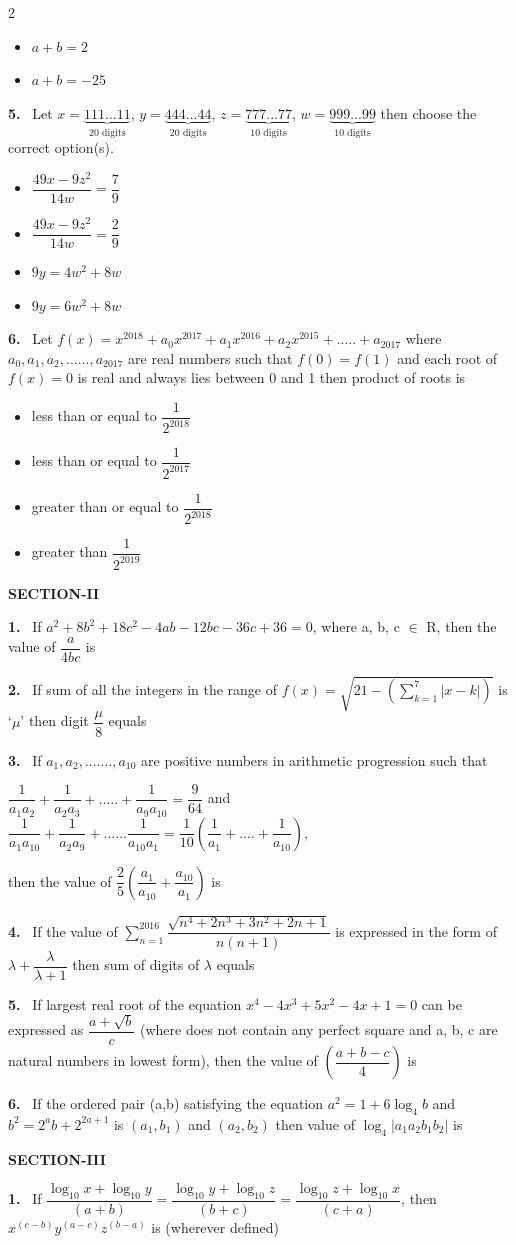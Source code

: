 \documentclass[10pt]{extarticle}
\newcommand{\sect}[1]{\par\smallskip\noindent\textbf{#1}\par}
\newcommand{\qn}[1]{\par\smallskip\noindent\textbf{#1.}~}
\newenvironment{qoptions}{\begin{itemize}[leftmargin=1.8em,itemsep=1pt,topsep=2pt,label={}]}{\end{itemize}}
\newcommand{\opt}[2]{\item[(#1)] #2}
\begin{document}
\begin{multicols}{2}
\begin{qoptions}
\opt{C}{$a+b=2$}
\opt{D}{$a+b=-25$}
\end{qoptions}
\qn{5} Let $x=\underbrace{111...11}_{\text{20 digits}}$, $y=\underbrace{444...44}_{\text{20 digits}}$, $z=\underbrace{777...77}_{\text{10 digits}}$, $w=\underbrace{999...99}_{\text{10 digits}}$ then choose the correct option(s).
\begin{qoptions}
\opt{A}{$\dfrac{49x-9z^2}{14w}=\dfrac79$}
\opt{B}{$\dfrac{49x-9z^2}{14w}=\dfrac29$}
\opt{C}{$9y=4w^2+8w$}
\opt{D}{$9y=6w^2+8w$}
\end{qoptions}
\qn{6} Let $f(x)=x^{2018}+a_0x^{2017}+a_1x^{2016}+a_2x^{2015}+.....+a_{2017}$ where $a_0,a_1,a_2,......,a_{2017}$ are real numbers such that $f(0)=f(1)$ and each root of $f(x)=0$ is real and always lies between 0 and 1 then product of roots is
\begin{qoptions}
\opt{A}{less than or equal to $\dfrac1{2^{2018}}$}
\opt{B}{less than or equal to $\dfrac1{2^{2017}}$}
\opt{C}{greater than or equal to $\dfrac1{2^{2018}}$}
\opt{D}{greater than $\dfrac1{2^{2019}}$}
\end{qoptions}
\sect{SECTION-II}
\qn{1} If $a^2+8b^2+18c^2-4ab-12bc-36c+36=0$, where a, b, c $\in$ R, then the value of $\dfrac a{4bc}$ is
\qn{2} If sum of all the integers in the range of $f(x)=\sqrt{21-\left(\sum_{k=1}^{7}|x-k|\right)}$ is `$\mu$' then digit $\dfrac\mu8$ equals
\qn{3} If $a_1,a_2,.......,a_{10}$ are positive numbers in arithmetic progression such that\par
$\dfrac1{a_1a_2}+\dfrac1{a_2a_3}+.....+\dfrac1{a_9a_{10}}=\dfrac9{64}$ and $\dfrac1{a_1a_{10}}+\dfrac1{a_2a_9}+......\dfrac1{a_{10}a_1}=\dfrac1{10}\left(\dfrac1{a_1}+....+\dfrac1{a_{10}}\right)$,\par
then the value of $\dfrac25\left(\dfrac{a_1}{a_{10}}+\dfrac{a_{10}}{a_1}\right)$ is
\qn{4} If the value of $\displaystyle\sum_{n=1}^{2016}\dfrac{\sqrt{n^4+2n^3+3n^2+2n+1}}{n(n+1)}$ is expressed in the form of $\lambda+\dfrac\lambda{\lambda+1}$ then sum of digits of $\lambda$ equals
\qn{5} If largest real root of the equation $x^4-4x^3+5x^2-4x+1=0$ can be expressed as $\dfrac{a+\sqrt b}c$ (where does not contain any perfect square and a, b, c are natural numbers in lowest form), then the value of $\left(\dfrac{a+b-c}4\right)$ is
\qn{6} If the ordered pair (a,b) satisfying the equation $a^2=1+6\log_4b$ and $b^2=2^ab+2^{2a+1}$ is $(a_1,b_1)$ and $(a_2,b_2)$ then value of $\log_4|a_1a_2b_1b_2|$ is
\sect{SECTION-III}
\qn{1} If $\dfrac{\log_{10}x+\log_{10}y}{(a+b)}=\dfrac{\log_{10}y+\log_{10}z}{(b+c)}=\dfrac{\log_{10}z+\log_{10}x}{(c+a)}$, then $x^{(c-b)}y^{(a-c)}z^{(b-a)}$ is (wherever defined)

\end{multicols}
\end{document}
